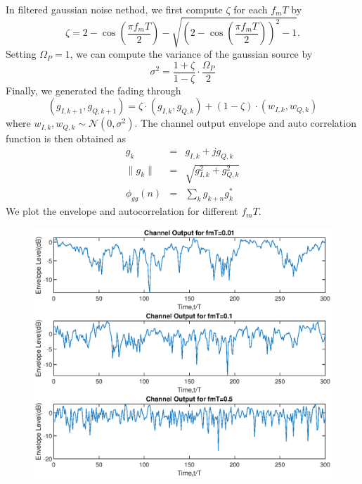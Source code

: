 In filtered gaussian noise nethod, we first compute $\zeta$ for each $f_mT$ by
\begin{equation*}
    \zeta = 2 - \cos \left(\frac{\pi f_mT}{2} \right) - \sqrt{(2 - \cos \left(\frac{\pi f_mT}{2} \right))^2 - 1}.
\end{equation*}
Setting $\Omega_P = 1$, we can compute the variance of the gaussian source by
\begin{equation*}
    \sigma^2 = \frac{1 + \zeta}{1 - \zeta} \cdot \frac{\Omega_P}{2}
\end{equation*}
Finally, we generated the fading through
\begin{equation*}
    \left(g_{I,k+1}, g_{Q,k+1}\right) = \zeta \cdot \left(g_{I,k}, g_{Q,k}\right) + \left(1 - \zeta\right) \cdot \left(w_{I,k}, w_{Q,k}\right)
\end{equation*}
where $w_{I,k}, w_{Q,k} \sim \mathcal{N}(0, \sigma^2)$. The channel output envelope and auto correlation function is then obtained as
\begin{eqnarray*}
    g_k          & = & g_{I,k} + j g_{Q, k} \\
    \|g_k\|      & = & \sqrt{g_{I,k}^2 + g_{Q, k}^2} \\
    \phi_{gg}(n) & = & \sum_k g_{k + n} g_k^{*}
\end{eqnarray*}
We plot the envelope and autocorrelation for different $f_mT$.
\begin{figure}[H]
    \centering
    \includegraphics[scale = 0.7]{fg_envelop.eps}
\end{figure}
